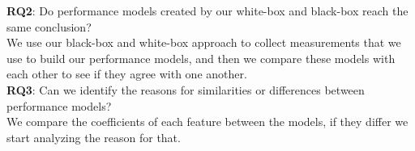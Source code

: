 \noindent \textbf{RQ2}: Do performance models created by our white-box and black-box reach the same conclusion?\\

\noindent We use our black-box and white-box approach to collect measurements that we use to build our performance models, and then we compare these models with each other to see if they agree with one another. \\

\noindent \textbf{RQ3}: Can we identify the reasons for similarities or differences between performance models?\\

\noindent We compare the coefficients of each feature between the models, if they differ we start analyzing the reason for that. \\
